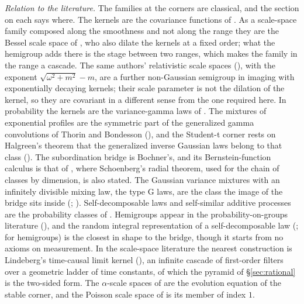 \emph{Relation to the literature.} The families at the corners are classical, and the
section on each says where. The \Matern{} kernels are the covariance functions of
. As a scale-space family
composed along the smoothness and not along the range they are the Bessel scale space of
, who also dilate the kernels at a fixed order; what the hemigroup
adds there is the stage between two ranges, which makes the family in the range a cascade. The
same authors' relativistic scale spaces (), with the
exponent $\sqrt{\omega^2 + m^2} - m$, are a further non-Gaussian semigroup in imaging with
exponentially decaying kernels; their scale parameter is not the dilation of the kernel, so
they are covariant in a different sense from the one required here. In probability the
\Matern{} kernels are the variance-gamma laws of
. The mixtures of exponential profiles are the
symmetric part of the generalized gamma convolutions of Thorin and Bondesson
(), and the Student-t corner rests on Halgreen's theorem
that the generalized inverse Gaussian laws belong to that class ().
The subordination bridge is Bochner's, and its Bernstein-function calculus is that of
, where Schoenberg's radial theorem, used for the chain of
classes by dimension, is also stated. The Gaussian variance mixtures with an infinitely
divisible mixing law, the type G laws, are the class the image of the bridge sits inside
(; ). Self-decomposable laws and self-similar additive processes are
the probability classes of . Hemigroups appear in the
probability-on-groups literature
(), and the random
integral representation of a self-decomposable law
(;  for hemigroups) is the closest in
shape to the bridge, though it starts from no axioms on measurement. In the scale-space
literature the nearest construction is Lindeberg's time-causal limit kernel
(), an infinite cascade of first-order filters over a geometric
ladder of time constants, of which the pyramid of \S\ref{sec:rational} is the two-sided form. The $\alpha$-scale spaces of  are the evolution
equation of the stable corner, and the Poisson scale space of 
is its member of index $1$.

